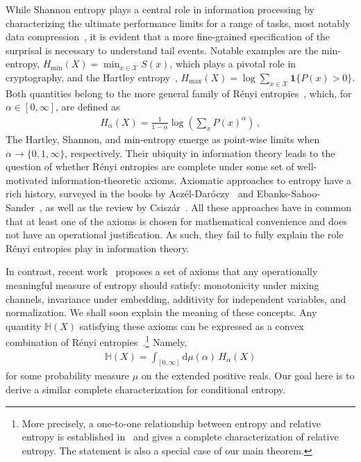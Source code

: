 \documentclass[aps,pra,11pt,onecolumn,nofootinbib,tightenlines]{revtex4-2}
\theoremstyle{definition}
\def \d {\mathrm{d}}
\renewcommand{\H}{\mathbb{H}}
\newcommand{\mc}[1]{\mathcal{#1}}
\begin{document}
While Shannon entropy plays a central role in information processing by characterizing the ultimate performance limits for a range of tasks, most notably data compression~\cite{shannon1948mathematical}, it is evident that a more fine-grained specification of the surprisal is necessary to understand tail events. Notable examples are the min-entropy, $H_{\min}(X) = \min_{x \in \mc{X}} S(x)$, which plays a pivotal role in cryptography, and the Hartley entropy~\cite{hartley28}, $H_{\max}(X) = \log \sum_{x \in \mc{X}} \mathbf{1}\{ P(x) > 0\}$. Both quantities belong to the more general family of R\'enyi entropies~\cite{renyi61}, which, for $\alpha\in[0,\infty]$, are defined as
\begin{align}
    H_{\alpha}(X)  = \frac{1}{1-\alpha} \log \left( \sum_{x} P(x)^{\alpha} \right) \,,
\end{align}
The Hartley, Shannon, and min-entropy emerge as point-wise limits when $\alpha \to \{0, 1, \infty\}$, respectively. Their ubiquity in information theory leads to the question of whether Rényi entropies are complete under some set of well-motivated information-theoretic axioms. Axiomatic approaches to entropy have a rich history, surveyed in the books by Acz\'el-Dar\'oczy~\cite{aczel75} and Ebanks-Sahoo-Sander~\cite{ebanks98}, as well as the review by Csisz\'ar~\cite{csiszar08}. All these approaches have in common that at least one of the axioms is chosen for mathematical convenience and does not have an operational justification. As such, they fail to fully explain the role Rényi entropies play in information theory. 

In contrast, recent work~\cite{gour21_axiomatic} proposes a set of axioms that 
any operationally meaningful measure of entropy should satisfy: monotonicity under mixing channels, invariance under embedding, additivity for independent variables, and normalization. We shall soon explain the meaning of these concepts.
%
%
Any quantity $\H(X)$ satisfying these axioms can be expressed as a convex combination of Rényi entropies~\cite{mu21_renyi,gour21_axiomatic}.\footnote{More precisely, a one-to-one relationship between entropy and relative entropy is established in~\cite{gour21_axiomatic} and \cite{mu21_renyi} gives a complete characterization of relative entropy. The statement is also a special case of our main theorem.} Namely,
\begin{align}\label{eq:EntropyBarycentre}
    \H(X) = \int_{[0,\infty]} \d\mu(\alpha) \, H_{\alpha}(X)
\end{align}
for some probability measure $\mu$ on the extended positive reals. Our goal here is to derive a similar complete characterization for conditional entropy.
\end{document}
